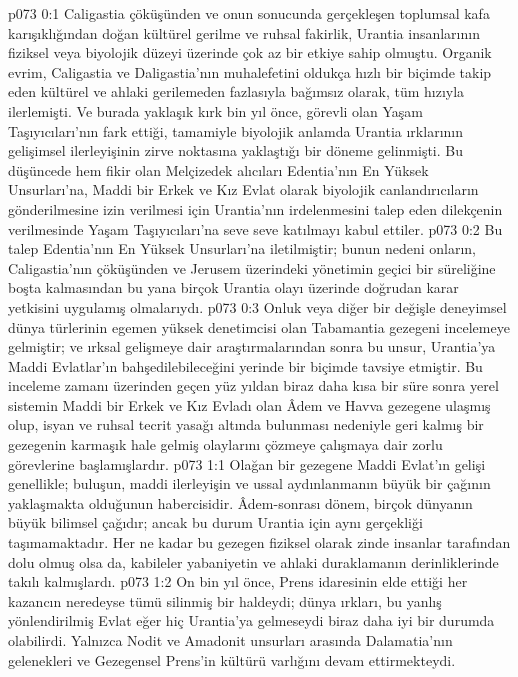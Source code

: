 \vs p073 0:1 Caligastia çöküşünden ve onun sonucunda gerçekleşen toplumsal kafa karışıklığından doğan kültürel gerilme ve ruhsal fakirlik, Urantia insanlarının fiziksel veya biyolojik düzeyi üzerinde çok az bir etkiye sahip olmuştu. Organik evrim, Caligastia ve Daligastia’nın muhalefetini oldukça hızlı bir biçimde takip eden kültürel ve ahlaki gerilemeden fazlasıyla bağımsız olarak, tüm hızıyla ilerlemişti. Ve burada yaklaşık kırk bin yıl önce, görevli olan Yaşam Taşıyıcıları’nın fark ettiği, tamamiyle biyolojik anlamda Urantia ırklarının gelişimsel ilerleyişinin zirve noktasına yaklaştığı bir döneme gelinmişti. Bu düşüncede hem fikir olan Melçizedek alıcıları Edentia’nın En Yüksek Unsurları’na, Maddi bir Erkek ve Kız Evlat olarak biyolojik canlandırıcıların gönderilmesine izin verilmesi için Urantia’nın irdelenmesini talep eden dilekçenin verilmesinde Yaşam Taşıyıcıları’na seve seve katılmayı kabul ettiler.
\vs p073 0:2 Bu talep Edentia’nın En Yüksek Unsurları’na iletilmiştir; bunun nedeni onların, Caligastia’nın çöküşünden ve Jerusem üzerindeki yönetimin geçici bir süreliğine boşta kalmasından bu yana birçok Urantia olayı üzerinde doğrudan karar yetkisini uygulamış olmalarıydı.
\vs p073 0:3 Onluk veya diğer bir değişle deneyimsel dünya türlerinin egemen yüksek denetimcisi olan Tabamantia gezegeni incelemeye gelmiştir; ve ırksal gelişmeye dair araştırmalarından sonra bu unsur, Urantia’ya Maddi Evlatlar’ın bahşedilebileceğini yerinde bir biçimde tavsiye etmiştir. Bu inceleme zamanı üzerinden geçen yüz yıldan biraz daha kısa bir süre sonra yerel sistemin Maddi bir Erkek ve Kız Evladı olan Âdem ve Havva gezegene ulaşmış olup, isyan ve ruhsal tecrit yasağı altında bulunması nedeniyle geri kalmış bir gezegenin karmaşık hale gelmiş olaylarını çözmeye çalışmaya dair zorlu görevlerine başlamışlardır.
\vs p073 1:1 Olağan bir gezegene Maddi Evlat’ın gelişi genellikle; buluşun, maddi ilerleyişin ve ussal aydınlanmanın büyük bir çağının yaklaşmakta olduğunun habercisidir. Âdem\hyp{}sonrası dönem, birçok dünyanın büyük bilimsel çağıdır; ancak bu durum Urantia için aynı gerçekliği taşımamaktadır. Her ne kadar bu gezegen fiziksel olarak zinde insanlar tarafından dolu olmuş olsa da, kabileler yabaniyetin ve ahlaki duraklamanın derinliklerinde takılı kalmışlardı.
\vs p073 1:2 On bin yıl önce, Prens idaresinin elde ettiği her kazancın neredeyse tümü silinmiş bir haldeydi; dünya ırkları, bu yanlış yönlendirilmiş Evlat eğer hiç Urantia’ya gelmeseydi biraz daha iyi bir durumda olabilirdi. Yalnızca Nodit ve Amadonit unsurları arasında Dalamatia’nın gelenekleri ve Gezegensel Prens’in kültürü varlığını devam ettirmekteydi.
